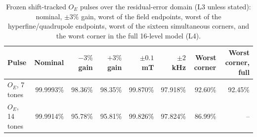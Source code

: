 \begin{table}[htbp]
\centering
\small
\setlength{\tabcolsep}{4pt}
\caption{Frozen shift-tracked $O_E$ pulses over the residual-error domain (L3 unless stated): nominal, $\pm3\%$ gain, worst of the field endpoints, worst of the hyperfine/quadrupole endpoints, worst of the sixteen simultaneous corners, and the worst corner in the full 16-level model (L4).}\label{tab:trackedrobust}
\begin{tabular}{lrrrrrrr}
\toprule
Pulse & Nominal & $-3\%$ gain & $+3\%$ gain & $\pm0.1$ mT & $\pm2$ kHz & Worst corner & Worst corner, full \\
\midrule
$O_E$, 7 tones & 99.9993\% & 98.36\% & 98.35\% & 99.870\% & 97.918\% & 92.60\% & 92.45\% \\
$O_E$, 14 tones & 99.9914\% & 95.78\% & 95.81\% & 99.826\% & 97.824\% & 86.99\% & -- \\
\bottomrule
\end{tabular}
\end{table}
